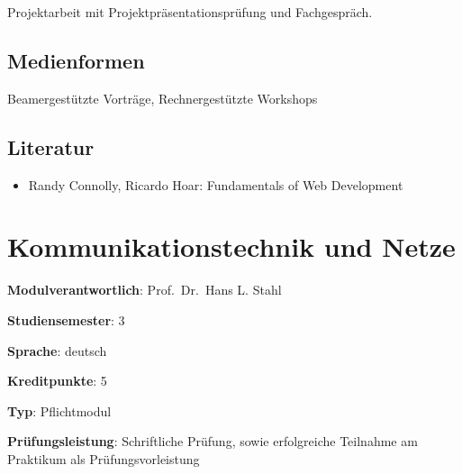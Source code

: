 Projektarbeit mit Projektpräsentationsprüfung und Fachgespräch.

\hypertarget{medienformenpathlabel....srcmodulbeschreibungen-bachelor-bpo5ba_frontend-development}{%
\section*{Medienformen\label{../../src/modulbeschreibungen-bachelor-bpo5/BA_Frontend-Development}}\label{medienformenpathlabel....srcmodulbeschreibungen-bachelor-bpo5ba_frontend-development}}

Beamergestützte Vorträge, Rechnergestützte Workshops

\hypertarget{literaturpathlabel....srcmodulbeschreibungen-bachelor-bpo5ba_frontend-development}{%
\section*{Literatur\label{../../src/modulbeschreibungen-bachelor-bpo5/BA_Frontend-Development}}\label{literaturpathlabel....srcmodulbeschreibungen-bachelor-bpo5ba_frontend-development}}

\begin{itemize}
\tightlist
\item
  Randy Connolly, Ricardo Hoar: Fundamentals of Web Development
\end{itemize}

\hypertarget{kommunikationstechnik-und-netzepathlabel....srcmodulbeschreibungen-bachelor-bpo5ba_kommunikationstechnikundnetze}{%
\chapter{Kommunikationstechnik und
Netze\label{../../src/modulbeschreibungen-bachelor-bpo5/BA_KommunikationstechnikundNetze}}\label{kommunikationstechnik-und-netzepathlabel....srcmodulbeschreibungen-bachelor-bpo5ba_kommunikationstechnikundnetze}}

\begin{modulHead}
\textbf{Modulverantwortlich}: Prof.~Dr.~Hans L.
Stahl
\end{modulHead}
\begin{modulHead}
\textbf{Studiensemester}:
3
\end{modulHead}
\begin{modulHead}
\textbf{Sprache}:
deutsch
\end{modulHead}
\begin{modulHead}
\textbf{Kreditpunkte}:
5
\end{modulHead}
\begin{modulHead}
\textbf{Typ}:
Pflichtmodul
\end{modulHead}
\begin{modulHead}
\textbf{Prüfungsleistung}:
Schriftliche Prüfung, sowie erfolgreiche Teilnahme am Praktikum als
Prüfungsvorleistung
\end{modulHead}


